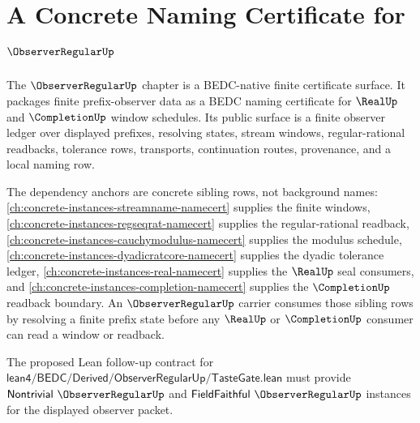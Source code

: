 \chapter{A Concrete Naming Certificate for $\ObserverRegularUp$}
\label{ch:concrete-instances-observerregular-namecert}

The $\ObserverRegularUp$ chapter is a BEDC-native finite certificate surface. It packages finite prefix-observer data as a BEDC naming certificate for $\RealUp$ and $\CompletionUp$ window schedules. Its public surface is a finite observer ledger over displayed prefixes, resolving states, stream windows, regular-rational readbacks, tolerance rows, transports, continuation routes, provenance, and a local naming row.

The dependency anchors are concrete sibling rows, not background names: \autoref{ch:concrete-instances-streamname-namecert} supplies the finite windows, \autoref{ch:concrete-instances-regseqrat-namecert} supplies the regular-rational readback, \autoref{ch:concrete-instances-cauchymodulus-namecert} supplies the modulus schedule, \autoref{ch:concrete-instances-dyadicratcore-namecert} supplies the dyadic tolerance ledger, \autoref{ch:concrete-instances-real-namecert} supplies the $\RealUp$ seal consumers, and \autoref{ch:concrete-instances-completion-namecert} supplies the $\CompletionUp$ readback boundary. An $\ObserverRegularUp$ carrier consumes those sibling rows by resolving a finite prefix state before any $\RealUp$ or $\CompletionUp$ consumer can read a window or readback.



The proposed Lean follow-up contract for $\mathsf{lean4/BEDC/Derived/ObserverRegularUp/TasteGate.lean}$ must provide $\mathsf{Nontrivial}\ \ObserverRegularUp$ and $\mathsf{FieldFaithful}\ \ObserverRegularUp$ instances for the displayed observer packet.

